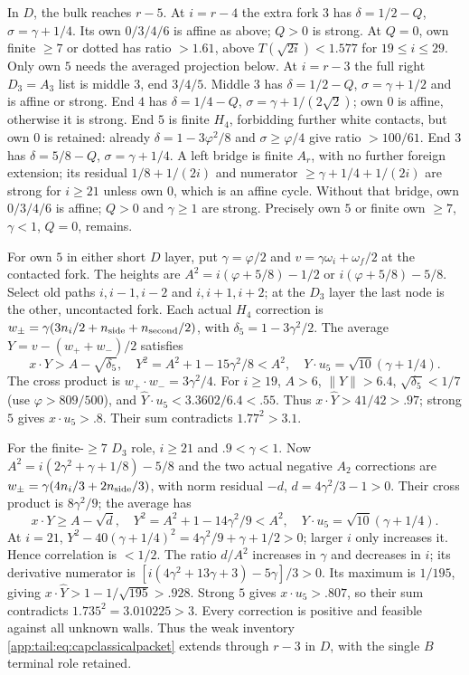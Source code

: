 \documentclass[11pt]{article}
\theoremstyle{definition}
\theoremstyle{remark}
\newcommand{\ph}{\varphi}
\begin{document}
In $D$, the bulk reaches $r-5$. At $i=r-4$ the extra fork $3$
has $\delta=1/2-Q$, $\sigma=\gamma+1/4$.
Its own $0/3/4/6$ is affine as above; $Q>0$ is strong.
At $Q=0$, own finite $\ge7$ or dotted has ratio $>1.61$,
above $T(\sqrt{2i})<1.577$ for $19\le i\le29$.
Only own $5$ needs the averaged projection below.
At $i=r-3$ the full right $D_3=A_3$ list is middle $3$, end $3/4/5$.
Middle $3$ has $\delta=1/2-Q$, $\sigma=\gamma+1/2$ and is
affine or strong. End $4$ has $\delta=1/4-Q$,
$\sigma=\gamma+1/(2\sqrt2)$; own $0$ is affine, otherwise it is
strong. End $5$ is finite $H_4$, forbidding further white contacts,
but own $0$ is retained: already
$\delta=1-3\ph^2/8$ and $\sigma\ge\ph/4$ give ratio $>100/61$.
End $3$ has $\delta=5/8-Q$, $\sigma=\gamma+1/4$.
A left bridge is finite $A_r$, with no further foreign extension;
its residual $1/8+1/(2i)$ and numerator
$\ge\gamma+1/4+1/(2i)$ are strong for $i\ge21$ unless own $0$,
which is an affine cycle. Without that bridge, own $0/3/4/6$ is
affine; $Q>0$ and $\gamma\ge1$ are strong. Precisely own $5$ or
finite own $\ge7$, $\gamma<1$, $Q=0$, remains.

For own $5$ in either short $D$ layer, put $\gamma=\ph/2$ and
$v=\gamma\omega_i+\omega_f/2$ at the contacted fork.
The heights are $A^2=i(\ph+5/8)-1/2$ or
$i(\ph+5/8)-5/8$. Select old paths $i,i-1,i-2$ and
$i,i+1,i+2$; at the $D_3$ layer the last node is the other,
uncontacted fork. Each actual $H_4$ correction is
$w_\pm=\gamma(3n_i/2+n_{\rm side}+n_{\rm second}/2)$,
with $\delta_5=1-3\gamma^2/2$.
The average $Y=v-(w_++w_-)/2$ satisfies
\[
 x\cdot Y>A-\sqrt{\delta_5},\quad
 Y^2=A^2+1-15\gamma^2/8<A^2,\quad
 Y\cdot u_5=\sqrt{10}(\gamma+1/4).
\]
The cross product is $w_+\cdot w_-=3\gamma^2/4$.
For $i\ge19$, $A>6$, $\|Y\|>6.4$,
$\sqrt{\delta_5}<1/7$ (use $\ph>809/500$), and
$\widehat Y\cdot u_5<3.3602/6.4<.55$.
Thus $x\cdot\widehat Y>41/42>.97$; strong $5$ gives
$x\cdot u_5>.8$. Their sum contradicts $1.77^2>3.1$.

For the finite-$\ge7$ $D_3$ role, $i\ge21$ and
$.9<\gamma<1$. Now
$A^2=i(2\gamma^2+\gamma+1/8)-5/8$ and the two actual negative
$A_2$ corrections are $w_\pm=\gamma(4n_i/3+2n_{\rm side}/3)$,
with norm residual $-d$, $d=4\gamma^2/3-1>0$.
Their cross product is $8\gamma^2/9$; the average has
\[
 x\cdot Y\ge A-\sqrt d,\quad
 Y^2=A^2+1-14\gamma^2/9<A^2,
 \quad Y\cdot u_5=\sqrt{10}(\gamma+1/4).
\]
At $i=21$,
$Y^2-40(\gamma+1/4)^2=4\gamma^2/9+\gamma+1/2>0$;
larger $i$ only increases it. Hence correlation is $<1/2$.
The ratio $d/A^2$ increases in $\gamma$ and decreases in $i$;
its derivative numerator is
$[i(4\gamma^2+13\gamma+3)-5\gamma]/3>0$.
Its maximum is $1/195$, giving
$x\cdot\widehat Y>1-1/\sqrt{195}>.928$.
Strong $5$ gives $x\cdot u_5>.807$, so their sum contradicts
$1.735^2=3.010225>3$.
Every correction is positive and feasible against all unknown walls.
Thus the weak inventory \eqref{app:tail:eq:capclassicalpacket} extends
through $r-3$ in $D$, with the single $B$ terminal role retained.
\end{document}
